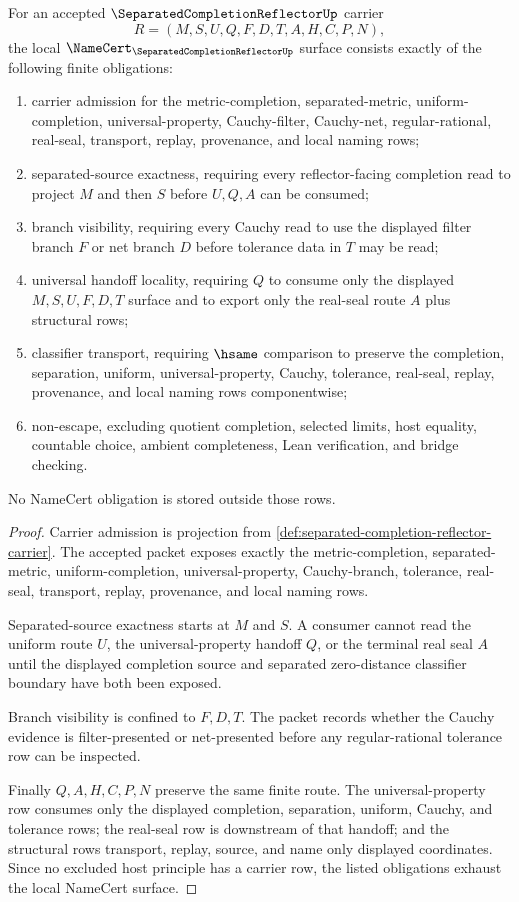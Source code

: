 \begin{theorem}
\label{thm:separated-completion-reflector-namecert-obligations}
For an accepted $\SeparatedCompletionReflectorUp$ carrier
$$
R=(M,S,U,Q,F,D,T,A,H,C,P,N),
$$
the local $\NameCert_{\SeparatedCompletionReflectorUp}$ surface consists exactly of the following finite obligations:
\begin{enumerate}
\item carrier admission for the metric-completion, separated-metric, uniform-completion, universal-property, Cauchy-filter, Cauchy-net, regular-rational, real-seal, transport, replay, provenance, and local naming rows;
\item separated-source exactness, requiring every reflector-facing completion read to project $M$ and then $S$ before $U,Q,A$ can be consumed;
\item branch visibility, requiring every Cauchy read to use the displayed filter branch $F$ or net branch $D$ before tolerance data in $T$ may be read;
\item universal handoff locality, requiring $Q$ to consume only the displayed $M,S,U,F,D,T$ surface and to export only the real-seal route $A$ plus structural rows;
\item classifier transport, requiring $\hsame$ comparison to preserve the completion, separation, uniform, universal-property, Cauchy, tolerance, real-seal, replay, provenance, and local naming rows componentwise;
\item non-escape, excluding quotient completion, selected limits, host equality, countable choice, ambient completeness, Lean verification, and bridge checking.
\end{enumerate}
No NameCert obligation is stored outside those rows.
\end{theorem}
\begin{proof}
Carrier admission is projection from \autoref{def:separated-completion-reflector-carrier}. The accepted packet exposes exactly the metric-completion, separated-metric, uniform-completion, universal-property, Cauchy-branch, tolerance, real-seal, transport, replay, provenance, and local naming rows.

Separated-source exactness starts at $M$ and $S$. A consumer cannot read the uniform route $U$, the universal-property handoff $Q$, or the terminal real seal $A$ until the displayed completion source and separated zero-distance classifier boundary have both been exposed.

Branch visibility is confined to $F,D,T$. The packet records whether the Cauchy evidence is filter-presented or net-presented before any regular-rational tolerance row can be inspected.

Finally $Q,A,H,C,P,N$ preserve the same finite route. The universal-property row consumes only the displayed completion, separation, uniform, Cauchy, and tolerance rows; the real-seal row is downstream of that handoff; and the structural rows transport, replay, source, and name only displayed coordinates. Since no excluded host principle has a carrier row, the listed obligations exhaust the local NameCert surface.
\end{proof}

